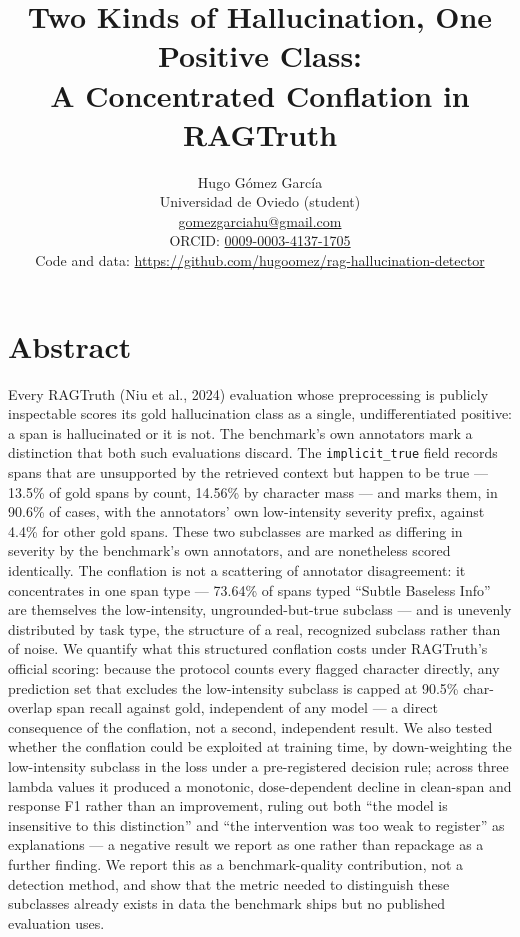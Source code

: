\documentclass[11pt]{article}
\title{Two Kinds of Hallucination, One Positive Class:\\A Concentrated Conflation in RAGTruth}
\author{
  Hugo Gómez García \orcidlink{0009-0003-4137-1705}\\
  \small Universidad de Oviedo (student)\\
  \small \href{mailto:gomezgarciahu@gmail.com}{gomezgarciahu@gmail.com}\\
  \small ORCID: \href{https://orcid.org/0009-0003-4137-1705}{0009-0003-4137-1705}\\
  \small Code and data: \url{https://github.com/hugoomez/rag-hallucination-detector}
}
\date{}
\newcounter{none}
\begin{document}
\maketitle
\thispagestyle{empty}

\section{Abstract}\label{abstract}

Every RAGTruth (Niu et al., 2024) evaluation whose preprocessing is publicly inspectable
scores its gold hallucination class as a single, undifferentiated positive: a span is
hallucinated or it is not. The benchmark's own annotators mark a distinction that both such
evaluations discard. The
\texttt{implicit\_true} field records spans that are unsupported by the retrieved context but
happen to be true --- 13.5\% of gold spans by count, 14.56\% by character mass --- and marks
them, in 90.6\% of cases, with the annotators' own low-intensity severity prefix, against
4.4\% for other gold spans. These two subclasses are marked as differing in severity by the
benchmark's own annotators, and are nonetheless scored identically. The conflation is not a
scattering of annotator disagreement: it concentrates in one span type --- 73.64\% of spans
typed ``Subtle Baseless Info'' are themselves the low-intensity, ungrounded-but-true
subclass --- and is unevenly distributed by task type, the structure of a real, recognized
subclass rather than of noise. We quantify what this structured conflation costs under
RAGTruth's official scoring: because the protocol counts every flagged character directly,
any prediction set that excludes the low-intensity subclass is capped at 90.5\% char-overlap
span recall against gold, independent of any model --- a direct consequence of the conflation,
not a second, independent result. We also tested whether the conflation could be exploited
at training time, by down-weighting the low-intensity subclass in the loss under a
pre-registered decision rule; across three lambda values it produced a monotonic,
dose-dependent decline in clean-span and response F1 rather than an improvement, ruling out
both ``the model is insensitive to this distinction'' and ``the intervention was too weak to
register'' as explanations --- a negative result we report as one rather than repackage as a
further finding. We report this as a
benchmark-quality contribution, not a detection method, and show that the metric needed to
distinguish these subclasses already exists in data the benchmark ships but no published
evaluation uses.
\end{document}
